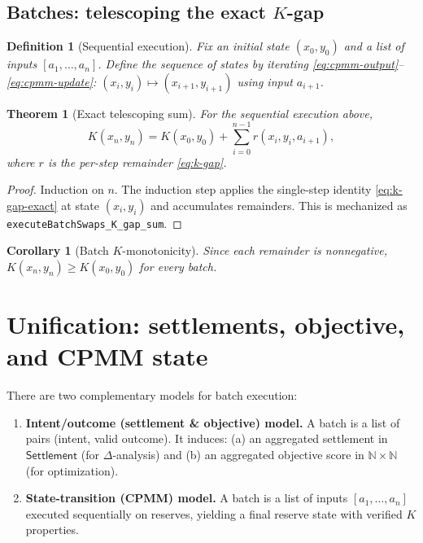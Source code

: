 \documentclass[11pt]{article}
\newtheorem{definition}{Definition}
\newtheorem{theorem}{Theorem}
\newtheorem{corollary}{Corollary}
\theoremstyle{remark}
\newcommand{\N}{\mathbb{N}}
\begin{document}
\subsection{Batches: telescoping the exact \texorpdfstring{$K$}{K}-gap}
\label{sec:batches}

\begin{definition}[Sequential execution]
Fix an initial state $(x_0,y_0)$ and a list of inputs $[a_1,\dots,a_n]$.
Define the sequence of states by iterating \eqref{eq:cpmm-output}--\eqref{eq:cpmm-update}:
$(x_{i},y_{i}) \mapsto (x_{i+1},y_{i+1})$ using input $a_{i+1}$.
\end{definition}

\begin{theorem}[Exact telescoping sum]
For the sequential execution above,
\begin{equation}
  K(x_n,y_n) = K(x_0,y_0) + \sum_{i=0}^{n-1} r(x_i,y_i,a_{i+1}),
  \label{eq:batch-k-gap-sum}
\end{equation}
where $r$ is the per-step remainder \eqref{eq:k-gap}.
\end{theorem}
\begin{proof}
Induction on $n$.
The induction step applies the single-step identity \eqref{eq:k-gap-exact} at state $(x_i,y_i)$
and accumulates remainders.
This is mechanized as \texttt{executeBatchSwaps\_K\_gap\_sum}.
\end{proof}

\begin{corollary}[Batch $K$-monotonicity]
Since each remainder is nonnegative, $K(x_n,y_n)\ge K(x_0,y_0)$ for every batch.
\end{corollary}

\section{Unification: settlements, objective, and CPMM state}
\label{sec:unification}

There are two complementary models for batch execution:
\begin{enumerate}[leftmargin=2em]
  \item \textbf{Intent/outcome (settlement \& objective) model.}
        A batch is a list of pairs (intent, valid outcome). It induces:
        (a) an aggregated settlement in $\mathsf{Settlement}$ (for $\Delta$-analysis) and
        (b) an aggregated objective score in $\N\times\N$ (for optimization).
  \item \textbf{State-transition (CPMM) model.}
        A batch is a list of inputs $[a_1,\dots,a_n]$ executed sequentially on reserves,
        yielding a final reserve state with verified $K$ properties.
\end{enumerate}
\end{document}
